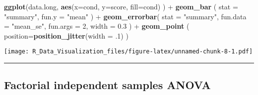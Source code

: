 \documentclass[]{article}
\newenvironment{Shaded}{\begin{snugshade}}{\end{snugshade}}
\newcommand{\KeywordTok}[1]{\textcolor[rgb]{0.13,0.29,0.53}{\textbf{{#1}}}}
\newcommand{\DataTypeTok}[1]{\textcolor[rgb]{0.13,0.29,0.53}{{#1}}}
\newcommand{\DecValTok}[1]{\textcolor[rgb]{0.00,0.00,0.81}{{#1}}}
\newcommand{\FloatTok}[1]{\textcolor[rgb]{0.00,0.00,0.81}{{#1}}}
\newcommand{\StringTok}[1]{\textcolor[rgb]{0.31,0.60,0.02}{{#1}}}
\newcommand{\NormalTok}[1]{{#1}}
\begin{document}
\begin{Shaded}
\begin{Highlighting}[]
\KeywordTok{ggplot}\NormalTok{(data.long, }\KeywordTok{aes}\NormalTok{(}\DataTypeTok{x=}\NormalTok{cond, }\DataTypeTok{y=}\NormalTok{score, }\DataTypeTok{fill=}\NormalTok{cond) ) +}\StringTok{ }
\StringTok{  }\KeywordTok{geom_bar}     \NormalTok{( }\DataTypeTok{stat =} \StringTok{"summary"}\NormalTok{, }\DataTypeTok{fun.y    =} \StringTok{"mean"} \NormalTok{) +}\StringTok{ }
\StringTok{  }\KeywordTok{geom_errorbar}\NormalTok{( }\DataTypeTok{stat =} \StringTok{"summary"}\NormalTok{, }\DataTypeTok{fun.data =} \StringTok{"mean_se"}\NormalTok{, }\DataTypeTok{fun.args =} \DecValTok{2}\NormalTok{, }\DataTypeTok{width =} \FloatTok{0.3} \NormalTok{) +}\StringTok{ }
\StringTok{  }\KeywordTok{geom_point}   \NormalTok{( }\DataTypeTok{position=}\KeywordTok{position_jitter}\NormalTok{(}\DataTypeTok{width =} \NormalTok{.}\DecValTok{1}\NormalTok{) )}
\end{Highlighting}
\end{Shaded}

\texttt{[image: R\_Data\_Visualization\_files/figure-latex/unnamed-chunk-8-1.pdf]}

\begin{center}\rule{0.5\linewidth}{\linethickness}\end{center}

\newpage

\subsection{Factorial independent samples
ANOVA}\label{factorial-independent-samples-anova}
\end{document}
